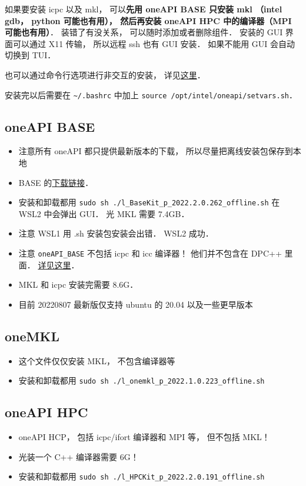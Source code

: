 

如果要安装 icpc 以及 mkl， 可以\textbf{先用 oneAPI BASE 只安装 mkl （intel gdb， python 可能也有用）， 然后再安装 oneAPI HPC 中的编译器（MPI 可能也有用）}．
装错了有没关系， 可以随时添加或者删除组件． 安装的 GUI 界面可以通过 X11 传输， 所以远程 ssh 也有 GUI 安装． 如果不能用 GUI 会自动切换到 TUI．

也可以通过命令行选项进行非交互的安装， 详见\href{http://www.example.com}{这里}．

安装完以后需要在 \verb|~/.bashrc| 中加上 \verb|source /opt/intel/oneapi/setvars.sh|．

\subsection{oneAPI BASE}
\begin{itemize}
\item 注意所有 oneAPI 都只提供最新版本的下载， 所以尽量把离线安装包保存到本地
\item BASE 的\href{https://www.intel.com/content/www/us/en/developer/tools/oneapi/base-toolkit-download.html?operatingsystem=linux&distributions=webdownload&options=offline}{下载链接}．
\item 安装和卸载都用 \verb`sudo sh ./l_BaseKit_p_2022.2.0.262_offline.sh` 在 WSL2 中会弹出 GUI． 光 MKL 需要 7.4GB．
\item 注意 WSL1 用 .sh 安装包安装会出错． WSL2 成功．
\item 注意 \verb|oneAPI_BASE| 不包括 icpc 和 icc 编译器！ 他们并不包含在 DPC++ 里面． \href{https://stackoverflow.com/questions/66527842/can-not-find-the-icc-compiler-after-having-installed-intel-oneapi-invoking-from}{详见这里}．
\item MKL 和 icpc 安装完需要 8.6G．
\item 目前 20220807 最新版仅支持 ubuntu 的 20.04 以及一些更早版本
\end{itemize}

\subsection{oneMKL}
\begin{itemize}
\item 这个文件仅仅安装 MKL， 不包含编译器等
\item 安装和卸载都用 \verb`sudo sh ./l_onemkl_p_2022.1.0.223_offline.sh`
\end{itemize}

\subsection{oneAPI HPC}
\begin{itemize}
\item oneAPI HCP， 包括 icpc/ifort 编译器和 MPI 等， 但不包括 MKL！
\item 光装一个 C++ 编译器需要 6G！
\item 安装和卸载都用 \verb`sudo sh ./l_HPCKit_p_2022.2.0.191_offline.sh`
\end{itemize}

